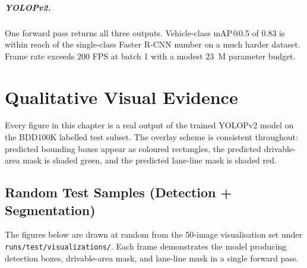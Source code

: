 \documentclass[12pt,a4paper]{report}
\begin{document}
\paragraph{YOLOPv2.} One forward pass returns all three outputs. Vehicle-class mAP@0.5 of $0.83$ is within reach of the single-class Faster R-CNN number on a much harder dataset. Frame rate exceeds $200$ FPS at batch 1 with a modest $23$~M parameter budget.


\chapter{Qualitative Visual Evidence}

Every figure in this chapter is a real output of the trained YOLOPv2 model on the BDD100K labelled test subset. The overlay scheme is consistent throughout: predicted bounding boxes appear as coloured rectangles, the predicted drivable-area mask is shaded green, and the predicted lane-line mask is shaded red.

\section{Random Test Samples (Detection + Segmentation)}

The figures below are drawn at random from the 50-image visualisation set under \texttt{runs/test/visualizations/}. Each frame demonstrates the model producing detection boxes, drivable-area mask, and lane-line mask in a single forward pass.
\end{document}
